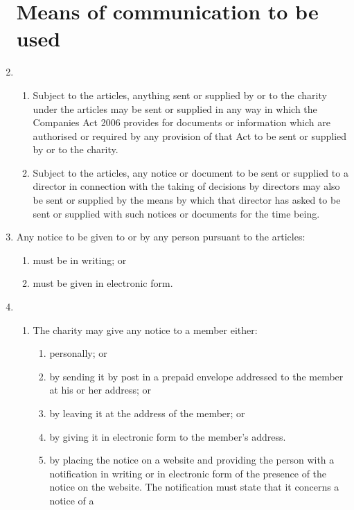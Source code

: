 \documentclass{article}
\begin{document}
\begin{enumerate}[label=\arabic*, start=23]
    \section{Means of communication to be used}
    \item \begin{enumerate}[label=(\arabic*)]
        \item Subject to the articles, anything sent or supplied by or to the
        charity under the articles may be sent or supplied in any way
        in which the Companies Act 2006 provides for documents or
        information which are authorised or required by any provision of
        that Act to be sent or supplied by or to the charity.
        \item Subject to the articles, any notice or document to be sent or
        supplied to a director in connection with the taking of decisions
        by directors may also be sent or supplied by the means by
        which that director has asked to be sent or supplied with such
        notices or documents for the time being.
    \end{enumerate}
    \item Any notice to be given to or by any person pursuant to the articles:
    \begin{enumerate}[label=(\arabic*)]
        \item must be in writing; or
        \item must be given in electronic form.
    \end{enumerate}
    \item \begin{enumerate}[label=(\arabic*)]
        \item The charity may give any notice to a member either:
        \begin{enumerate}[label=(\alph*)]
            \item personally; or
            \item by sending it by post in a prepaid envelope addressed to
            the member at his or her address; or
            \item by leaving it at the address of the member; or
            \item by giving it in electronic form to the member's address.
            \item by placing the notice on a website and providing the
            person with a notification in writing or in electronic
            form of the presence of the notice on the website. The
            notification must state that it concerns a notice of a

\end{enumerate}
\end{enumerate}
\end{enumerate}
\end{document}
